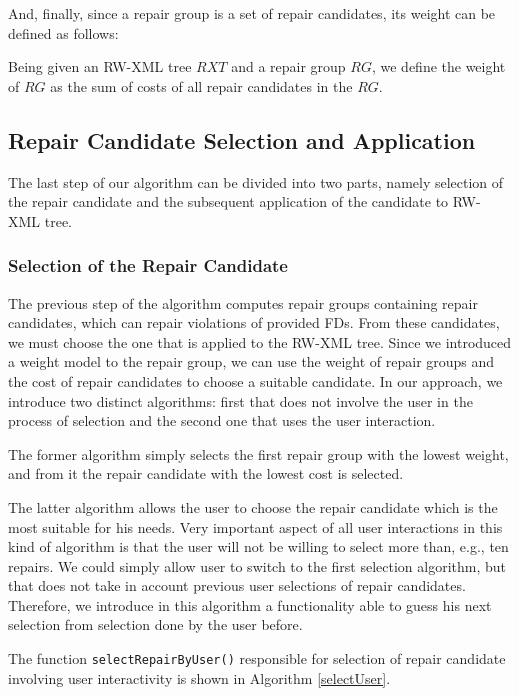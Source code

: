 And, finally, since a repair group is a set of repair candidates, its weight can be defined as follows:

\begin{define}
Being given an RW-XML tree $RXT$ and a repair group $RG$, we define the weight of $RG$ as the sum of costs of all repair candidates in the $RG$.
\end{define}

\subsection{Repair Candidate Selection and Application}

The last step of our algorithm can be divided into two parts, namely selection of the repair candidate and the subsequent application of the candidate to RW-XML tree.

\subsubsection{Selection of the Repair Candidate}

The previous step of the algorithm computes repair groups containing repair candidates, which can repair violations of provided FDs. From these candidates, we must choose the one that is applied to the RW-XML tree. Since we introduced a weight model to the repair group, we can use the weight of repair groups and the cost of repair candidates to choose a suitable candidate. In our approach, we introduce two distinct algorithms: first that does not involve the user in the process of selection and the second one that uses the user interaction.

The former algorithm simply selects the first repair group with the lowest weight, and from it the repair candidate with the lowest cost is selected.

The latter algorithm allows the user to choose the repair candidate which is the most suitable for his needs. Very important aspect of all user interactions in this kind of algorithm is that the user will not be willing to select more than, e.g., ten repairs. We could simply allow user to switch to the first selection algorithm, but that does not take in account previous user selections of repair candidates. Therefore, we introduce in this algorithm a functionality able to guess his next selection from selection done by the user before.

The function \texttt{selectRepairByUser()} responsible for selection of repair candidate involving user interactivity is shown in Algorithm \ref{selectUser}.

